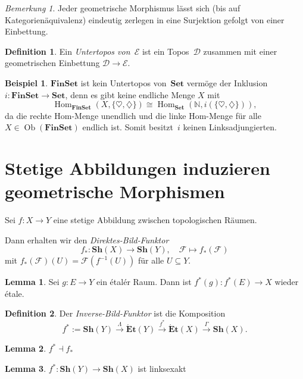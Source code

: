 \documentclass{article}
\theoremstyle{definition}
\newtheorem*{defn}{Definition}
\newtheorem*{lem}{Lemma}
\newtheorem*{bsp}{Beispiel}
\theoremstyle{remark}
\newtheorem*{bem}{Bemerkung}
\newcommand{\coloneqq}{:=} %
\newcommand{\?}{\,{:}\,}
\renewcommand{\_}{\mathpunct{.}\,}
\newcommand{\N}{\mathbb{N}} %
\DeclareMathOperator{\Ob}{Ob} %
\DeclareMathOperator{\Hom}{Hom} %
\newcommand{\ladj}{\dashv} %
\newcommand{\SetC}{\mathbf{Set}} %
\newcommand{\FinSetC}{\mathbf{FinSet}} %
\newcommand{\Sh}{\mathbf{Sh}} %
\newcommand{\Etale}{\mathbf{\acute{E}t}} %
\newcommand{\Dat}{\mathcal{D}} %
\newcommand{\Eat}{\mathcal{E}} %
\newcommand{\Fais}{\mathcal{F}} %
\begin{document}
\begin{bem}
  Jeder geometrische Morphismus lässt sich (bis auf Kategorienäquivalenz) eindeutig zerlegen in eine Surjektion gefolgt von einer Einbettung.
\end{bem}

\begin{defn}
  Ein \emph{Untertopos von~$\Eat$} ist ein Topos~$\Dat$ zusammen mit einer geometrischen Einbettung $\Dat \to \Eat$.
\end{defn}

\begin{bsp}
  $\FinSetC$ ist kein Untertopos von~$\SetC$ vermöge der Inklusion $i : \FinSetC \to \SetC$, denn es gibt keine endliche Menge $X$ mit
  \[ \Hom_\FinSetC(X, \{ \heartsuit, \diamondsuit \}) \cong \Hom_\SetC(\N, i(\{ \heartsuit, \diamondsuit \})), \]
  da die rechte Hom-Menge unendlich und die linke Hom-Menge für alle $X \in \Ob(\FinSetC)$ endlich ist.
  Somit besitzt~$i$ keinen Linksadjungierten.
\end{bsp}

\section{Stetige Abbildungen induzieren geometrische Morphismen}

Sei $f : X \to Y$ eine stetige Abbildung zwischen topologischen Räumen.

Dann erhalten wir den \emph{Direktes-Bild-Funktor}
\[
  f_* : \Sh(X) \to \Sh(Y), \quad
  \Fais \mapsto f_*(\Fais)
\]
mit $f_*(\Fais)(U) = \Fais(f^{-1}(U))$ für alle $U \subseteq Y$.

\begin{lem}
  Sei $g : E \to Y$ ein étalér Raum.
  Dann ist $f^*(g) : f^*(E) \to X$ wieder étale.
\end{lem}

\begin{defn}
  Der \emph{Inverse-Bild-Funktor} ist die Komposition
  \[
    f^* \coloneqq \Sh(Y) \xrightarrow{\Lambda} \Etale(Y) \xrightarrow{f^*} \Etale(X) \xrightarrow{\Gamma} \Sh(X).
  \]
\end{defn}

\begin{lem}
  $f^* \ladj f_*$  
\end{lem}

\begin{lem}
  $f^* : \Sh(Y) \to \Sh(X)$ ist linksexakt
\end{lem}
\end{document}
